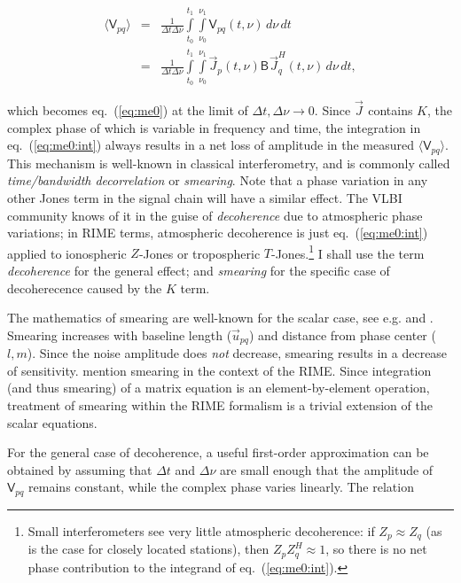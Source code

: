 \documentclass[]{aa}
\newcommand{\herm}{H}
\newcommand{\jones}[2]{\vec {#1}_{#2}}
\newcommand{\jonesT}[2]{\vec {#1}^{\herm}_{#2}}
\newcommand{\coh}[2]{\mathsf{{#1}}_{{#2}}}
\begin{document}
\begin{eqnarray}
\langle \coh{V}{pq} \rangle & = & \frac{1}{\Delta t\Delta\nu}\int\limits^{t_1}_{t_0} \int\limits^{\nu_1}_{\nu_0} \coh{V}{pq}(t,\nu)\,d\nu\,dt \nonumber \\
\label{eq:me0:int}
& = & \frac{1}{\Delta t\Delta\nu}\int\limits^{t_1}_{t_0} \int\limits^{\nu_1}_{\nu_0} \jones{J}{p} (t,\nu) \coh{B}{}  \jonesT{J}{q}(t,\nu) \, d\nu\,dt,
\end{eqnarray}

which becomes eq.~(\ref{eq:me0}) at the limit of $\Delta t,\Delta\nu \to 0$. Since $\jones{J}{}$ contains $K$, the complex phase of which is variable in frequency and time, the integration in eq.~(\ref{eq:me0:int}) always results in a net loss of amplitude in the measured $\langle \coh{V}{pq} \rangle $. This mechanism is well-known in classical interferometry, and is commonly called {\em time/bandwidth decorrelation} or {\em smearing}. Note that a phase variation in any other Jones term in the signal chain will have a similar effect. The VLBI community knows of it in the guise of {\em decoherence} due to atmospheric phase variations; in RIME terms, atmospheric decoherence is just eq.~(\ref{eq:me0:int}) applied to ionospheric $Z$-Jones or tropospheric $T$-Jones.\footnote{Small interferometers see very little atmospheric decoherence: if $Z_p\approx Z_q$ (as is the case for closely located stations), then $Z_p Z^\herm_q \approx 1$, so there is no net phase contribution to the integrand of eq.~(\ref{eq:me0:int}).} I shall use the term {\em decoherence} for the general effect; and {\em smearing} for the specific case of decoherecence caused by the $K$ term.

The mathematics of smearing are well-known for the scalar case, see e.g. \citet[Sect.~6.4]{tms} and \citet{Bridle:smearing}. Smearing increases with baseline length ($\vec u_{pq}$) and distance from phase center ($l,m$). Since the noise amplitude does {\em not} decrease, smearing results in a decrease of sensitivity. \citet{ME1} mention smearing in the context of the RIME. Since integration (and thus smearing) of a matrix equation is an element-by-element operation,  treatment of smearing within the RIME formalism is a trivial extension of the scalar equations.

For the general case of decoherence, a useful first-order approximation can be obtained by assuming that $\Delta t$ and $\Delta\nu$ are small enough that the amplitude of $\coh{V}{pq}$ remains constant, while the complex phase varies linearly. The relation
\end{document}
